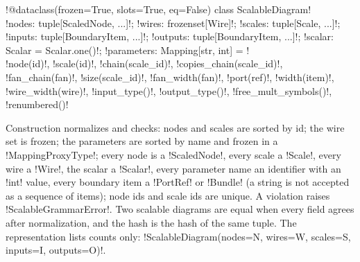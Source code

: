 \begin{signature}
\py!@dataclass(frozen=True, slots=True, eq=False) class ScalableDiagram!\\
\quad \py!nodes: tuple[ScaledNode, ...]!; \py!wires: frozenset[Wire]!; \py!scales: tuple[Scale, ...]!; \py!inputs: tuple[BoundaryItem, ...]!; \py!outputs: tuple[BoundaryItem, ...]!; \py!scalar: Scalar = Scalar.one()!; \py!parameters: Mapping[str, int] = {}!\\
\quad \py!node(id)!, \py!scale(id)!, \py!chain(scale_id)!, \py!copies_chain(scale_id)!, \py!fan_chain(fan)!, \py!size(scale_id)!, \py!fan_width(fan)!, \py!port(ref)!, \py!width(item)!, \py!wire_width(wire)!, \py!input_type()!, \py!output_type()!, \py!free_mult_symbols()!, \py!renumbered()!
\end{signature}

Construction normalizes and checks: nodes and scales are sorted by id; the wire set is frozen; the parameters are sorted by name and frozen in a \py!MappingProxyType!; every node is a \py!ScaledNode!, every scale a \py!Scale!, every wire a \py!Wire!, the scalar a \py!Scalar!, every parameter name an identifier with an \py!int! value, every boundary item a \py!PortRef! or \py!Bundle! (a string is not accepted as a sequence of items); node ids and scale ids are unique. A violation raises \py!ScalableGrammarError!. Two scalable diagrams are equal when every field agrees after normalization, and the hash is the hash of the same tuple. The representation lists counts only: \code!ScalableDiagram(nodes=N, wires=W, scales=S, inputs=I, outputs=O)!.

